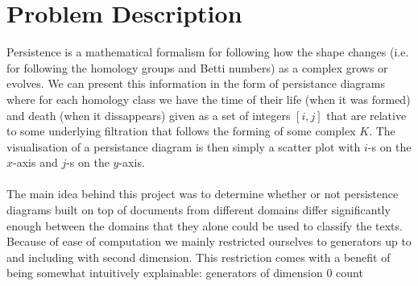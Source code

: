 \section{Problem Description} 
\label{sec:problem_description}

Persistence is a mathematical formalism for following how the shape changes (i.e. for following the homology groups and Betti numbers) as a complex grows or evolves. We can present this information in the form of persistance diagrams where for each homology class we have the time of their life (when it was formed) and death (when it dissappears) given as a set of integers $[i, j]$ that are relative to some underlying filtration that follows the forming of some complex $K$. The visualisation of a persistance diagram is then simply a scatter plot with $i$-s on the $x$-axis and $j$-s on the $y$-axis.\\
\\
The main idea behind this project was to determine whether or not persistence
diagrams built on top of documents from different domains differ significantly
enough between the domains that they alone could be used to classify the texts.
Because of ease of computation we mainly restricted ourselves to generators up
to and including with second dimension. This restriction comes with a benefit
of being somewhat intuitively explainable: generators of dimension 0 count

